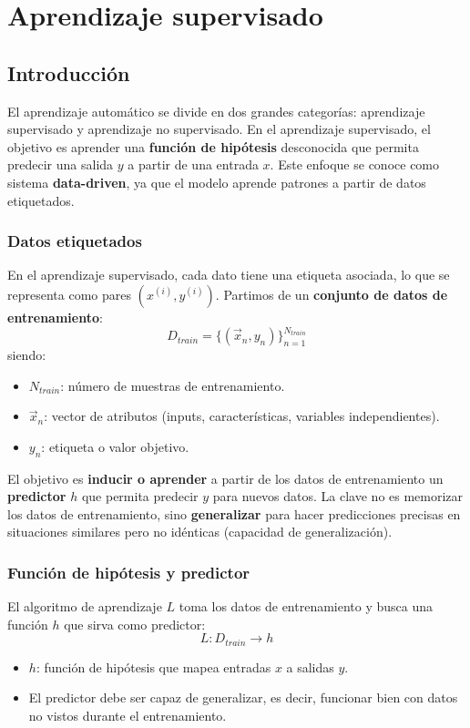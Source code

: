 \chapter{Aprendizaje supervisado}
\section{Introducción}
El aprendizaje automático se divide en dos grandes categorías: aprendizaje supervisado y aprendizaje no supervisado. En el aprendizaje supervisado, el objetivo es aprender una \textbf{función de hipótesis} desconocida que permita predecir una salida $y$ a partir de una entrada $x$. Este enfoque se conoce como sistema \textbf{data-driven}, ya que el modelo aprende patrones a partir de datos etiquetados.

\subsection{Datos etiquetados}
En el aprendizaje supervisado, cada dato tiene una etiqueta asociada, lo que se representa como pares $(x^{(i)}, y^{(i)})$. Partimos de un \textbf{conjunto de datos de entrenamiento}:
$$D_{train} = \{ (\vec{x}_n, y_n)\}^{N_{train}}_{n=1}$$
siendo:
\begin{itemize}
\item $N_{train}$: número de muestras de entrenamiento.
\item $\vec{x}_n$: vector de atributos (inputs, características, variables independientes).
\item $y_n$: etiqueta o valor objetivo.
\end{itemize}

El objetivo es \textbf{inducir o aprender} a partir de los datos de entrenamiento un \textbf{predictor} $h$ que permita predecir $y$ para nuevos datos. La clave no es memorizar los datos de entrenamiento, sino \textbf{generalizar} para hacer predicciones precisas en situaciones similares pero no idénticas (capacidad de generalización).

\subsection{Función de hipótesis y predictor}
El algoritmo de aprendizaje $L$ toma los datos de entrenamiento y busca una función $h$ que sirva como predictor:
$$L:D_{train} \rightarrow h$$
\begin{itemize}
\item $h$: función de hipótesis que mapea entradas $x$ a salidas $y$.
\item El predictor debe ser capaz de generalizar, es decir, funcionar bien con datos no vistos durante el entrenamiento.
\end{itemize}


